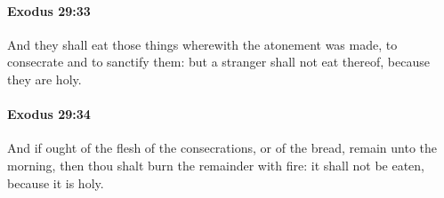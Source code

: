 		\paragraph{Exodus 29:33} %
			\label{EXODUS-29-33}

			And they shall eat those things wherewith the atonement was made, to consecrate and to sanctify them: but a stranger shall not eat thereof, because they are holy.


		\paragraph{Exodus 29:34} %
			\label{EXODUS-29-34}

			And if ought of the flesh of the consecrations, or of the bread, remain unto the morning, then thou shalt burn the remainder with fire: it shall not be eaten, because it is holy.


